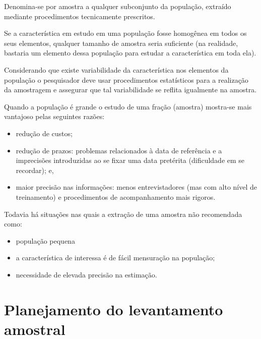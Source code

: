 \documentclass[
]{book}
\providecommand{\tightlist}{%
  \setlength{\itemsep}{0pt}\setlength{\parskip}{0pt}}
\begin{document}
\hfill\break

Denomina-se por amostra a qualquer subconjunto da população, extraído mediante procedimentos tecnicamente prescritos.

\hfill\break

Se a característica em estudo em uma população fosse homogênea em todos os seus elementos, qualquer tamanho de amostra seria suficiente (na realidade, bastaria um elemento dessa população para estudar a característica em toda ela).

\hfill\break

Considerando que existe variabilidade da característica nos elementos da população o pesquisador deve usar procedimentos estatísticos para a realização da amostragem e assegurar que tal variabilidade se reflita igualmente na amostra.

\hfill\break

Quando a população é grande o estudo de uma fração (amostra) mostra-se mais vantajoso pelas seguintes razões:

\hfill\break

\begin{itemize}
\tightlist
\item
  redução de custos;\\
\item
  redução de prazos: problemas relacionados à data de referência e a imprecisões introduzidas ao se fixar uma data pretérita (dificuldade em se recordar); e,\\
\item
  maior precisão nas informações: menos entrevistadores (mas com alto nível de treinamento) e procedimentos de acompanhamento mais rigoros.
\end{itemize}

\hfill\break

Todavia há situações nas quais a extração de uma amostra não recomendada como:

\hfill\break

\begin{itemize}
\tightlist
\item
  população pequena
\item
  a característica de interessa é de fácil mensuração na população;
\item
  necessidade de elevada precisão na estimação.
\end{itemize}

\hypertarget{planejamento-do-levantamento-amostral}{%
\section{Planejamento do levantamento amostral}\label{planejamento-do-levantamento-amostral}}
\end{document}
